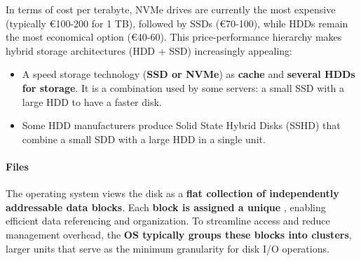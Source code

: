 \highspace
In terms of cost per terabyte, NVMe drives are currently the most expensive (typically €100-200 for 1 TB), followed by SSDs (€70-100), while HDDs remain the most economical option (€40-60). This price-performance hierarchy makes hybrid storage architectures (HDD + SSD) increasingly appealing:
\begin{itemize}
    \item A speed storage technology (\textbf{SSD or NVMe}) as \textbf{cache} and \textbf{several HDDs for storage}. It is a combination used by some servers: a small SSD with a large HDD to have a faster disk.
    
    \item Some HDD manufacturers produce Solid State Hybrid Disks (SSHD) that combine a small SDD with a large HDD in a single unit.
\end{itemize}

\newpage

\paragraph{Files}

The operating system views the disk as a \textbf{flat collection of independently addressable data blocks}. Each \textbf{block is assigned a unique} \label{LBA (Logical Block Address)}, enabling efficient data referencing and organization. To streamline access and reduce management overhead, the \textbf{OS typically groups these blocks into clusters}, larger units that serve as the minimum granularity for disk I/O operations.

